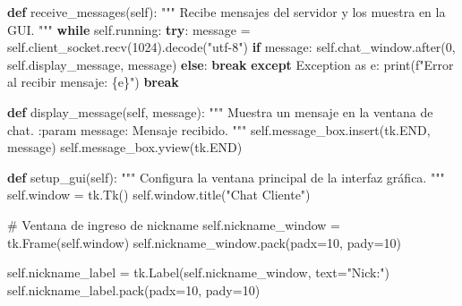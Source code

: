 \documentclass[
  a4paper,
  DIV=11,
  numbers=noendperiod,
  onepage,
  openany]{scrreprt}
\newenvironment{Shaded}{\begin{snugshade}}{\end{snugshade}}
\newcommand{\BuiltInTok}[1]{\textcolor[rgb]{0.00,0.23,0.31}{#1}}
\newcommand{\CommentTok}[1]{\textcolor[rgb]{0.37,0.37,0.37}{#1}}
\newcommand{\ControlFlowTok}[1]{\textcolor[rgb]{0.00,0.23,0.31}{\textbf{#1}}}
\newcommand{\DecValTok}[1]{\textcolor[rgb]{0.68,0.00,0.00}{#1}}
\newcommand{\ImportTok}[1]{\textcolor[rgb]{0.00,0.46,0.62}{#1}}
\newcommand{\KeywordTok}[1]{\textcolor[rgb]{0.00,0.23,0.31}{\textbf{#1}}}
\newcommand{\NormalTok}[1]{\textcolor[rgb]{0.00,0.23,0.31}{#1}}
\newcommand{\OperatorTok}[1]{\textcolor[rgb]{0.37,0.37,0.37}{#1}}
\newcommand{\PreprocessorTok}[1]{\textcolor[rgb]{0.68,0.00,0.00}{#1}}
\newcommand{\SpecialCharTok}[1]{\textcolor[rgb]{0.37,0.37,0.37}{#1}}
\newcommand{\SpecialStringTok}[1]{\textcolor[rgb]{0.13,0.47,0.30}{#1}}
\newcommand{\StringTok}[1]{\textcolor[rgb]{0.13,0.47,0.30}{#1}}
\newcommand{\VariableTok}[1]{\textcolor[rgb]{0.07,0.07,0.07}{#1}}
\begin{document}
\begin{Shaded}
\begin{Highlighting}[]
    \KeywordTok{def}\NormalTok{ receive\_messages(}\VariableTok{self}\NormalTok{):}
        \CommentTok{"""}
\CommentTok{        Recibe mensajes del servidor y los muestra en la GUI.}
\CommentTok{        """}
        \ControlFlowTok{while} \VariableTok{self}\NormalTok{.running:}
            \ControlFlowTok{try}\NormalTok{:}
\NormalTok{                message }\OperatorTok{=} \VariableTok{self}\NormalTok{.client\_socket.recv(}\DecValTok{1024}\NormalTok{).decode(}\StringTok{"utf{-}8"}\NormalTok{)}
                \ControlFlowTok{if}\NormalTok{ message:}
                    \VariableTok{self}\NormalTok{.chat\_window.after(}\DecValTok{0}\NormalTok{, }\VariableTok{self}\NormalTok{.display\_message, message)}
                \ControlFlowTok{else}\NormalTok{:}
                    \ControlFlowTok{break}
            \ControlFlowTok{except} \PreprocessorTok{Exception} \ImportTok{as}\NormalTok{ e:}
                \BuiltInTok{print}\NormalTok{(}\SpecialStringTok{f"Error al recibir mensaje: }\SpecialCharTok{\{}\NormalTok{e}\SpecialCharTok{\}}\SpecialStringTok{"}\NormalTok{)}
                \ControlFlowTok{break}

    \KeywordTok{def}\NormalTok{ display\_message(}\VariableTok{self}\NormalTok{, message):}
        \CommentTok{"""}
\CommentTok{        Muestra un mensaje en la ventana de chat.}
\CommentTok{        :param message: Mensaje recibido.}
\CommentTok{        """}
        \VariableTok{self}\NormalTok{.message\_box.insert(tk.END, message)}
        \VariableTok{self}\NormalTok{.message\_box.yview(tk.END)}

    \KeywordTok{def}\NormalTok{ setup\_gui(}\VariableTok{self}\NormalTok{):}
        \CommentTok{"""}
\CommentTok{        Configura la ventana principal de la interfaz gráfica.}
\CommentTok{        """}
        \VariableTok{self}\NormalTok{.window }\OperatorTok{=}\NormalTok{ tk.Tk()}
        \VariableTok{self}\NormalTok{.window.title(}\StringTok{"Chat Cliente"}\NormalTok{)}

        \CommentTok{\# Ventana de ingreso de nickname}
        \VariableTok{self}\NormalTok{.nickname\_window }\OperatorTok{=}\NormalTok{ tk.Frame(}\VariableTok{self}\NormalTok{.window)}
        \VariableTok{self}\NormalTok{.nickname\_window.pack(padx}\OperatorTok{=}\DecValTok{10}\NormalTok{, pady}\OperatorTok{=}\DecValTok{10}\NormalTok{)}

        \VariableTok{self}\NormalTok{.nickname\_label }\OperatorTok{=}\NormalTok{ tk.Label(}\VariableTok{self}\NormalTok{.nickname\_window, text}\OperatorTok{=}\StringTok{"Nick:"}\NormalTok{)}
        \VariableTok{self}\NormalTok{.nickname\_label.pack(padx}\OperatorTok{=}\DecValTok{10}\NormalTok{, pady}\OperatorTok{=}\DecValTok{10}\NormalTok{)}


\end{Highlighting}
\end{Shaded}
\end{document}
